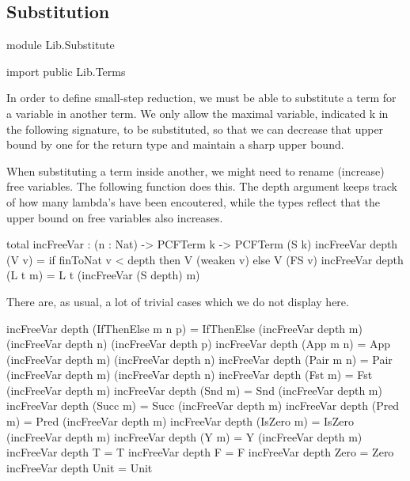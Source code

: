 \subsection{Substitution}

\begin{hidden}
module Lib.Substitute

import public Lib.Terms
\end{hidden}

In order to define small-step reduction, we must be able to substitute a term
for a variable in another term.
We only allow the maximal variable, indicated k in the following signature, to be substituted,
so that we can decrease that upper bound by one for the return type and maintain a sharp upper bound.

When substituting a term inside another, we might need to rename (increase)
free variables. The following function does this.
The depth argument keeps track of how many lambda's have been encoutered,
while the types reflect that the upper bound on free variables also increases.

\begin{code}
total incFreeVar : (n : Nat) -> PCFTerm k -> PCFTerm (S k)
incFreeVar depth (V v)    = if finToNat v < depth
                              then V (weaken v)
                            else V (FS v)
incFreeVar depth (L t m)  = L t (incFreeVar (S depth) m)
\end{code}

There are, as usual, a lot of trivial cases which we do not display here.

\begin{hidden}
incFreeVar depth (IfThenElse m n p) = IfThenElse (incFreeVar depth m) (incFreeVar depth n) (incFreeVar depth p)
incFreeVar depth (App m n)          = App (incFreeVar depth m) (incFreeVar depth n)
incFreeVar depth (Pair m n)         = Pair (incFreeVar depth m) (incFreeVar depth n)
incFreeVar depth (Fst m)            = Fst (incFreeVar depth m)
incFreeVar depth (Snd m)            = Snd (incFreeVar depth m)
incFreeVar depth (Succ m)           = Succ (incFreeVar depth m)
incFreeVar depth (Pred m)           = Pred (incFreeVar depth m)
incFreeVar depth (IsZero m)         = IsZero (incFreeVar depth m)
incFreeVar depth (Y m)              = Y (incFreeVar depth m)
incFreeVar depth T                  = T
incFreeVar depth F                  = F
incFreeVar depth Zero               = Zero
incFreeVar depth Unit               = Unit
\end{hidden}

